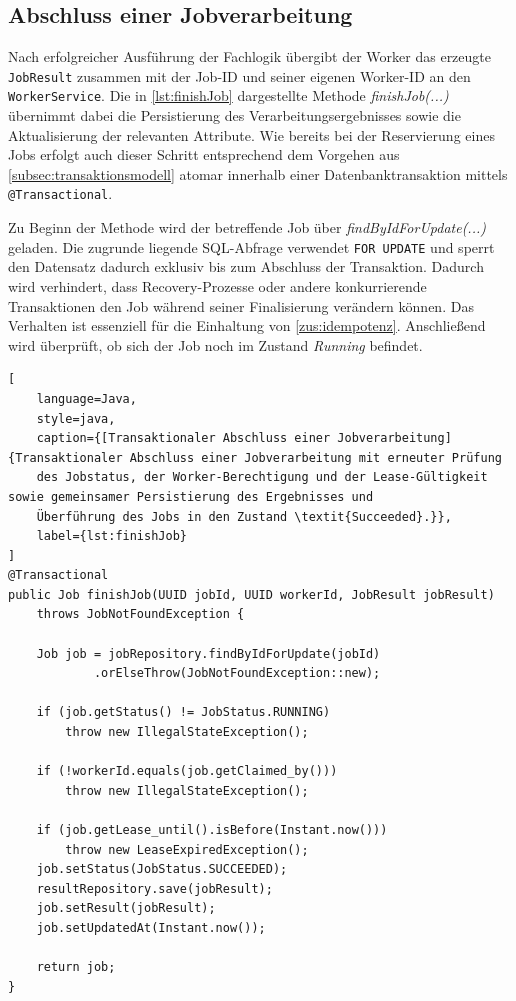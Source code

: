 \subsection{Abschluss einer Jobverarbeitung}
\label{subsec:impl_abschlussJoberverarbeitung}
Nach erfolgreicher Ausführung der Fachlogik übergibt der Worker das erzeugte \texttt{JobResult} zusammen mit der Job-ID
und seiner eigenen Worker-ID an den \texttt{WorkerService}.
Die in \cref{lst:finishJob} dargestellte Methode \textit{finishJob(...)} übernimmt dabei die Persistierung
des Verarbeitungsergebnisses sowie die Aktualisierung der relevanten Attribute.
Wie bereits bei der Reservierung eines Jobs erfolgt auch dieser Schritt entsprechend dem Vorgehen aus
\cref{subsec:transaktionsmodell} atomar innerhalb einer Datenbanktransaktion mittels \texttt{@Transactional}.

Zu Beginn der Methode wird der betreffende Job über \textit{findByIdForUpdate(...)} geladen.
Die zugrunde liegende SQL-Abfrage verwendet \texttt{FOR UPDATE} und sperrt den Datensatz dadurch exklusiv bis zum Abschluss der Transaktion.
Dadurch wird verhindert, dass Recovery-Prozesse oder andere konkurrierende Transaktionen den Job während seiner Finalisierung verändern können.
Das Verhalten ist essenziell für die Einhaltung von \ref{zus:idempotenz}.
Anschließend wird überprüft, ob sich der Job noch im Zustand \textit{Running} befindet.

\begin{lstlisting}[
    language=Java,
    style=java,
    caption={[Transaktionaler Abschluss einer Jobverarbeitung]{Transaktionaler Abschluss einer Jobverarbeitung mit erneuter Prüfung
    des Jobstatus, der Worker-Berechtigung und der Lease-Gültigkeit sowie gemeinsamer Persistierung des Ergebnisses und
    Überführung des Jobs in den Zustand \textit{Succeeded}.}},
    label={lst:finishJob}
]
@Transactional
public Job finishJob(UUID jobId, UUID workerId, JobResult jobResult)
    throws JobNotFoundException {

    Job job = jobRepository.findByIdForUpdate(jobId)
            .orElseThrow(JobNotFoundException::new);

    if (job.getStatus() != JobStatus.RUNNING)
        throw new IllegalStateException();

    if (!workerId.equals(job.getClaimed_by()))
        throw new IllegalStateException();

    if (job.getLease_until().isBefore(Instant.now()))
        throw new LeaseExpiredException();
    job.setStatus(JobStatus.SUCCEEDED);
    resultRepository.save(jobResult);
    job.setResult(jobResult);
    job.setUpdatedAt(Instant.now());

    return job;
}
\end{lstlisting}


